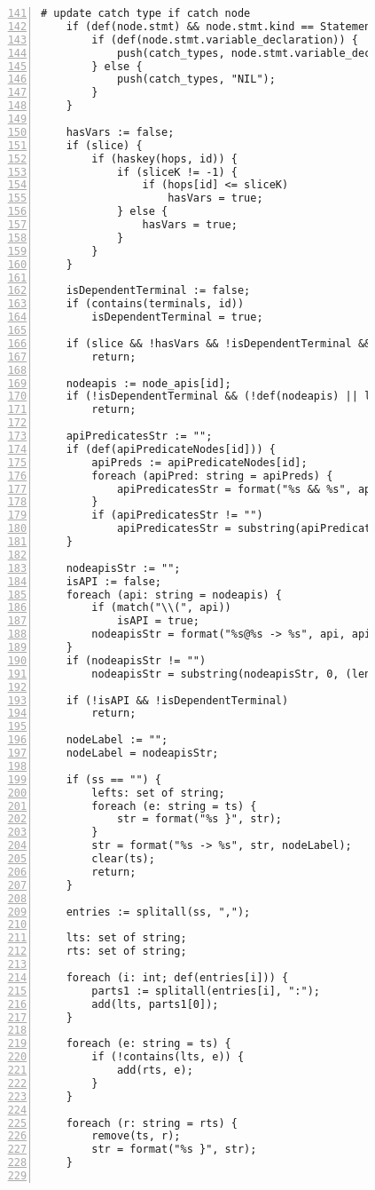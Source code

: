 \begin{figure}[ht!]
\begin{lstlisting}[numbers=left, tabsize=4, escapechar=@, caption={API Usage Mining Analysis},label={lst:aun-code},  firstline = 141, firstnumber = 141, lastline = 201]
	# update catch type if catch node
	if (def(node.stmt) && node.stmt.kind == StatementKind.CATCH) {
	    if (def(node.stmt.variable_declaration)) {
	        push(catch_types, node.stmt.variable_declaration.variable_type.name);    
	    } else {
	        push(catch_types, "NIL");
	    }
	}
	
	hasVars := false;
	if (slice) {
		if (haskey(hops, id)) {
			if (sliceK != -1) {
				if (hops[id] <= sliceK)
					hasVars = true;
			} else {
				hasVars = true;
			}	
		}
	}
	    
	isDependentTerminal := false;
	if (contains(terminals, id))
	    isDependentTerminal = true;
	    
	if (slice && !hasVars && !isDependentTerminal && !hasCatchOrFinally(ss))
	    return;
	    
	nodeapis := node_apis[id];
	if (!isDependentTerminal && (!def(nodeapis) || len(nodeapis) == 0))
	    return;
	    
	apiPredicatesStr := "";
	if (def(apiPredicateNodes[id])) { 
	    apiPreds := apiPredicateNodes[id];
	    foreach (apiPred: string = apiPreds) {
	        apiPredicatesStr = format("%s && %s", apiPredicatesStr, apiPred);
	    }
	    if (apiPredicatesStr != "")
	        apiPredicatesStr = substring(apiPredicatesStr, 4);
	}
	
	nodeapisStr := "";    
	isAPI := false;
	foreach (api: string = nodeapis) {
	    if (match("\\(", api))
	        isAPI = true;
	    nodeapisStr = format("%s@%s -> %s", api, apiPredicatesStr, nodeapisStr);    
	}
	if (nodeapisStr != "")
	    nodeapisStr = substring(nodeapisStr, 0, (len(nodeapisStr) - 4));
	    
	if (!isAPI && !isDependentTerminal) 
	    return;
	    
	nodeLabel := ""; 
	nodeLabel = nodeapisStr; 
	
	if (ss == "") {
	    lefts: set of string;
	    foreach (e: string = ts) {
            str = format("%s }", str);
	    }
	    str = format("%s -> %s", str, nodeLabel);
	    clear(ts);
		return;
	}
		
	entries := splitall(ss, ",");
	
	lts: set of string; 
	rts: set of string;
	
	foreach (i: int; def(entries[i])) {
		parts1 := splitall(entries[i], ":");
		add(lts, parts1[0]);
	}	
	
	foreach (e: string = ts) {
		if (!contains(lts, e)) {
			add(rts, e);
		}
	}
	
	foreach (r: string = rts) {
		remove(ts, r);
		str = format("%s }", str);
	}
	

\end{lstlisting}
\end{figure}
